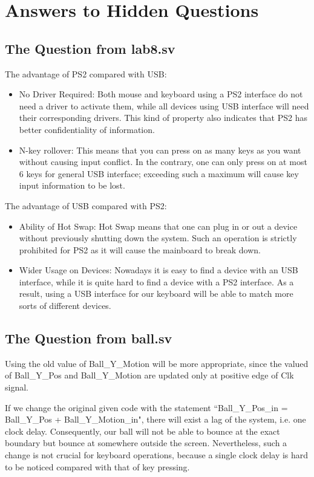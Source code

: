 \documentclass[11pt]{article}
\begin{document}
\section{Answers to Hidden Questions}
\subsection{The Question from lab8.sv}
The advantage of PS2 compared with USB:
\begin{itemize}
\item No Driver Required: Both mouse and keyboard using a PS2 interface do not need a driver to activate them, while all devices using USB interface will need their corresponding drivers. This kind of property also indicates that PS2 has better confidentiality of information.
\item N-key rollover: This means that you can press on as many keys as you want without causing input conflict. In the contrary, one can only press on at most 6 keys for general USB interface; exceeding such a maximum will cause key input information to be lost.
\end{itemize}
The advantage of USB compared with PS2:
\begin{itemize}
\item Ability of Hot Swap: Hot Swap means that one can plug in or out a device without previously shutting down the system. Such an operation is strictly prohibited for PS2 as it will cause the mainboard to break down.
\item Wider Usage on Devices: Nowadays it is easy to find a device with an USB interface, while it is quite hard to find a device with a PS2 interface. As a result, using a USB interface for our keyboard will be able to match more sorts of different devices.
\end{itemize}

\subsection{The Question from ball.sv}
Using the old value of Ball\_Y\_Motion will be more appropriate, since the valued of Ball\_Y\_Pos and Ball\_Y\_Motion are updated only at positive edge of Clk signal.

If we change the original given code with the statement ``Ball\_Y\_Pos\_in = Ball\_Y\_Pos + Ball\_Y\_Motion\_in", there will exist a lag of the system, i.e. one clock delay. Consequently, our ball will not be able to bounce at the exact boundary but bounce at somewhere outside the screen. Nevertheless, such a change is not crucial for keyboard operations, because a single clock delay is hard to be noticed compared with that of key pressing.
\end{document}
